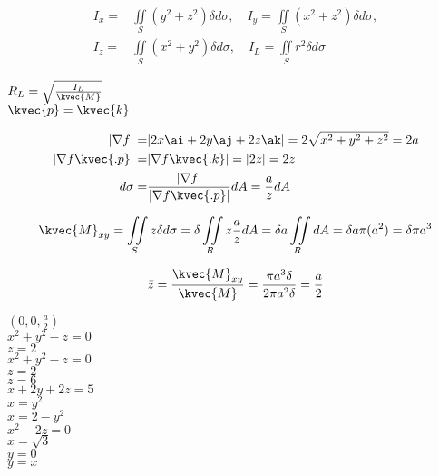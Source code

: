 \begin{align*}
I_x =&\iint\limits_{S} (y^2+z^2)\delta d\sigma, \quad I_y =\iint\limits_{S} (x^2+z^2)\delta d\sigma,\\
I_z =&\iint\limits_{S} (x^2+y^2)\delta d\sigma, \quad I_L =\iint\limits_{S} r^2\delta d\sigma
\end{align*}

\(R_L= \sqrt{\frac{I_{L}}{\kvec{M}}}\)
\\
\(\kvec{p}=\kvec{k}\)

\begin{align*}
|\nabla f|=&|2x\ai+2y\aj+2z\ak|=2 \sqrt{x^2+y^2+z^2}=2a \\
|\nabla f\kvec{.p}|=&|\nabla f \kvec{.k}|=|2z|= 2z\\
d\sigma =& \frac{|\nabla f|}{|\nabla f\kvec{.p}|}dA= \frac{a}{z}dA
\end{align*}

\[\kvec{M}_{xy}=\iint\limits_{S}z\delta d\sigma = \delta\iint\limits_{R} z\frac{a}{z} dA=\delta a\iint\limits_{R} dA= \delta a\pi (a^2)=\delta \pi a^3\]

\[\bar{z}= \frac{\kvec{M}_{xy}}{\kvec{M}}= \frac{\pi a^3\delta}{2\pi a^2 \delta}=\frac{a}{2}\]

\((0,0,\frac{a}{2})\)
\\
\(x^2+y^2-z=0\) \\
\(z=2\)   \\
\(x^2+y^2-z=0\)  \\
\(z=2\)  \\
\(z=6\)   \\
\(x+2y+2z=5\)   \\
\(x=y^2\)   \\
\(x=2-y^2\)  \\
\(x^2-2z=0\)   \\
\(x=\sqrt{3}\)    \\
\(y=0\)  \\
\(y=x\) \\

